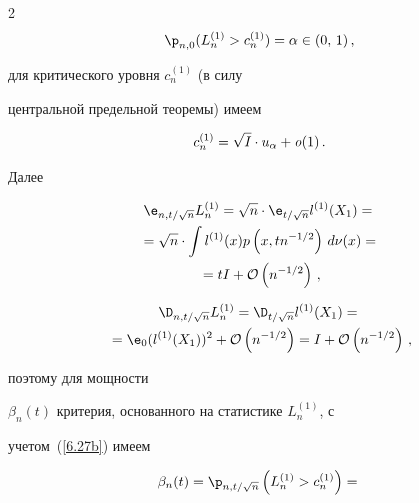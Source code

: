 \begin{multicols}{2}
$$


{\p}_{n,0}(L_n^{(1)}>c_n^{(1)}) = \alpha \in (0,\,1)\,,


$$


для критического уровня $c_n^{(1)}$ (в силу


центральной предельной теоремы) имеем


\begin{equation}


c_n^{(1)} =


\sqrt{I}\cdot u_{\alpha}+{\it o}(1)\,.


\label{6.27b}


\end{equation}


Далее


\begin{multline*}


{\e}_{n,t/\sqrt{n}}L_n^{(1)}=


\sqrt{n}\cdot {\e}_{t/\sqrt{n}}l^{(1)}(X_1) = {}\\


{}= \sqrt{n}\cdot \int


l^{(1)}(x)p\left (x,tn^{-1/2}\right )\,d\nu(x)={}\\


{} = tI + {\cal O}\left (n^{-1/2}\right )\,,


\end{multline*}





\noindent


\begin{multline*}


{\D}_{n,t/\sqrt{n}}L_n^{(1)}= {\D}_{t/\sqrt{n}}l^{(1)}(X_1)={}\\


{}={\e}_0(l^{(1)}(X_1))^2+{\cal O}\left (n^{-1/2}\right )=


I + {\cal O}\left (n^{-1/2}\right )\,,


\end{multline*}


поэтому для мощности


$\beta_n(t)$ критерия, основанного на статистике $L_n^{(1)}$,  с


учетом~(\ref{6.27b}) имеем


\begin{multline*}


\beta_n(t)=


{\p}_{n,t/\sqrt{n}}\left ( L_n^{(1)}>c_n^{(1)}\right )={}\\



\end{multline*}
\end{multicols}
